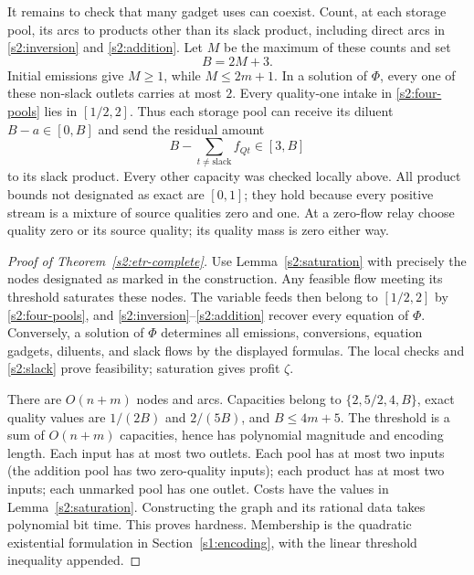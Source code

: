 It remains to check that many gadget uses can coexist. Count, at each
storage pool, its arcs to products other than its slack product, including
direct arcs in \eqref{s2:inversion} and \eqref{s2:addition}. Let $M$ be
the maximum of these counts and set
\begin{equation}
 B=2M+3.\label{s2:B}
\end{equation}
Initial emissions give $M\ge1$, while $M\le2m+1$. In a solution of
$\Phi$, every one of these non-slack outlets carries at most $2$.
Every quality-one intake in \eqref{s2:four-pools} lies in $[1/2,2]$.
Thus each storage pool can receive its diluent $B-a\in[0,B]$ and
send the residual amount
\begin{equation}
 B-\sum_{t\ne\mathrm{slack}}f_{Qt}\in[3,B]\label{s2:slack}
\end{equation}
to its slack product. Every other capacity was checked locally above.
All product bounds not designated as exact are $[0,1]$; they hold
because every positive stream is a mixture of source qualities zero
and one. At a zero-flow relay choose quality zero or its source quality;
its quality mass is zero either way.

\begin{proof}[Proof of Theorem~\ref{s2:etr-complete}]
Use Lemma~\ref{s2:saturation} with precisely the nodes designated as
marked in the construction.
Any feasible flow meeting its threshold saturates these nodes.
The variable feeds then belong to $[1/2,2]$ by
\eqref{s2:four-pools}, and \eqref{s2:inversion}--\eqref{s2:addition}
recover every equation of $\Phi$. Conversely, a solution of $\Phi$
determines all emissions, conversions, equation gadgets, diluents,
and slack flows by the displayed formulas. The local checks and
\eqref{s2:slack} prove feasibility; saturation gives profit $\zeta$.

There are $O(n+m)$ nodes and arcs. Capacities belong to
$\{2,5/2,4,B\}$, exact quality values are $1/(2B)$ and $2/(5B)$,
and $B\le4m+5$. The threshold is a sum of $O(n+m)$ capacities, hence
has polynomial magnitude and encoding length. Each input has at most
two outlets. Each pool has at most two inputs (the addition pool has
two zero-quality inputs); each product has at most two inputs; each
unmarked pool has one outlet. Costs have the values in
Lemma~\ref{s2:saturation}. Constructing the graph and its rational
data takes polynomial bit time. This proves hardness. Membership is
the quadratic existential formulation in Section~\ref{s1:encoding},
with the linear threshold inequality appended.
\end{proof}

